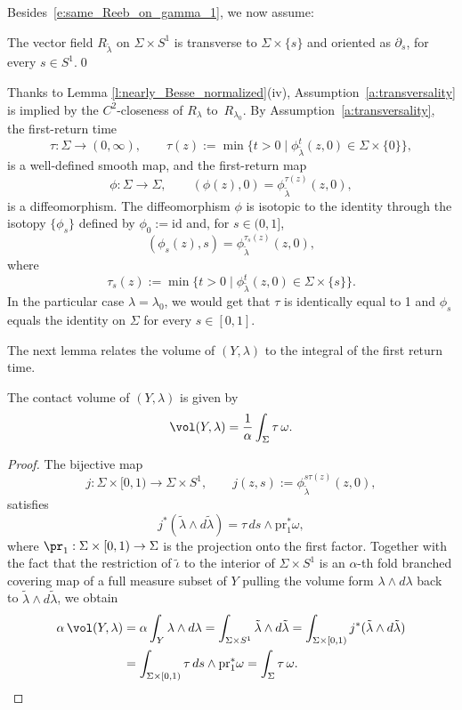 Besides~\eqref{e:same_Reeb_on_gamma_1}, we now assume:
\begin{ass}
\label{a:transversality}
The vector field $R_{\tilde\lambda}$ on $\Sigma\times S^1$ is transverse to $\Sigma\times \{s\}$ and oriented as $\partial_s$, for every $s\in S^1$.\hfill\qed
\end{ass}

Thanks to Lemma \ref{l:nearly_Besse_normalized}(iv), Assumption~\ref{a:transversality} is implied by the $C^2$-closeness of $R_{\lambda}$ to~$R_{\lambda_0}$. By Assumption~\ref{a:transversality}, the first-return time
\begin{equation}
\label{e:first_return_time}
\tau:\Sigma\to(0,\infty),
\qquad
\tau(z):=\min\big\{t>0\mid \phi_{\tilde\lambda}^t(z,0)\in\Sigma\times\{0\}\big\},
\end{equation}
is a well-defined smooth map, and the first-return map
\begin{equation}
\label{e:first_return_map}
\phi:\Sigma\to \Sigma,
\qquad
(\phi(z),0)=\phi_{\tilde\lambda}^{\tau(z)}(z,0),
\end{equation}
is a diffeomorphism. The diffeomorphism $\phi$ is isotopic to the identity through the isotopy $\{\phi_s\}$ defined by $\phi_0:= \mathrm{id}$ and, for $s\in (0,1]$,
\begin{equation}
\label{isotopy}
(\phi_s(z),s)=\phi_{\tilde\lambda}^{\tau_s(z)}(z,0),
\end{equation}
where
\[
\tau_s(z):=\min\big\{t>0\mid \phi_{\tilde\lambda}^t(z,0)\in\Sigma\times\{s\}\big\}.
\]
In the particular case $\lambda=\lambda_0$, we would get that $\tau$ is identically equal to 1 and $\phi_s$ equals the identity on $\Sigma$ for every $s\in [0,1]$.

The next lemma relates the volume of $(Y,\lambda)$ to the integral of the first return time.

\begin{lem}
\label{l:volume}
The contact volume of $(Y,\lambda)$ is given by
\[
\vol(Y,\lambda) = \frac1\alpha \int_\Sigma \tau\,\omega.
\]
\end{lem}

\begin{proof}
The bijective map
\[
j: \Sigma \times [0,1) \to \Sigma \times S^1, \qquad j(z,s) := \phi_{\tilde{\lambda}}^{s\tau(z)} (z,0),
\]
satisfies
\[
j^*(\tilde\lambda \wedge d\tilde\lambda) = \tau\, ds \wedge \mathrm{pr}_1^* \omega,
\]
where $\pr_1:\Sigma\times [0,1) \to\Sigma$ is the projection onto the first factor. Together with the fact that the restriction of $\tilde{\iota}$ to the interior of $\Sigma\times S^1$
is an $\alpha$-th fold branched covering map of a full measure subset of $Y$ pulling the volume form $\lambda\wedge d\lambda$ back to $\tilde\lambda \wedge d\tilde\lambda$, we obtain
\begin{align*}
\alpha\, \vol(Y,\lambda) &= \alpha \int_Y \lambda \wedge d\lambda = \int_{\Sigma\times S^1} \tilde\lambda \wedge d\tilde\lambda = \int_{\Sigma\times [0,1)} j^*( \tilde\lambda \wedge d\tilde\lambda) \\ &= \int_{\Sigma\times [0,1)} \tau\, ds \wedge \mathrm{pr}_1^* \omega = \int_{\Sigma} \tau \, \omega.\qedhere
\end{align*}
\end{proof}

